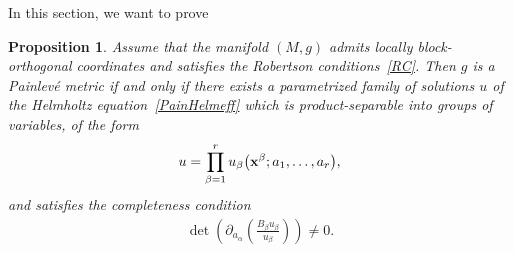\documentclass[pdftex]{sigma}
\numberwithin{equation}{section}
\newtheorem{Proposition}[Theorem]{Proposition}
 { \theoremstyle{definition}
\newtheorem{Definition}[Theorem]{Definition}
\newtheorem{Example}[Theorem]{Example}
\newtheorem{Remark}[Theorem]{Remark} }
\begin{document}
In this section, we want to prove

\begin{Proposition} \label{PainSchro}
 Assume that the manifold $(M,g)$ admits locally block-orthogonal coordinates and satisfies the Robertson conditions~\eqref{RC}. Then $g$ is a Painlev\'e metric if and only if there exists a parametrized family of solutions $u$ of the Helmholtz equation~\eqref{PainHelmeff} which is product-separable into groups of variables, of the form
\begin{gather}\label{Blocksep}
u=\prod_{\beta =1}^{r}u_{\beta}\big({\bf x}^{\beta};a_{1},\dots,a_{r}\big),
\end{gather}
and satisfies the completeness condition
\begin{gather}\label{rankPainHelm}
\det \left({\partial_{a_{\alpha}}\left(\frac{B_{\beta} u_{\beta}}{u_{\beta}}\right)}\right)\neq 0.
\end{gather}
\end{Proposition}
\end{document}
